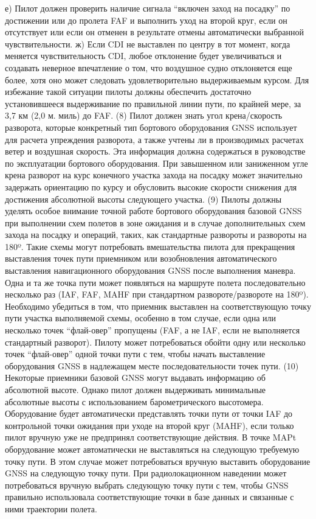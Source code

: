 е)	Пилот должен проверить наличие сигнала “включен заход на посадку” по достижении или до пролета FAF и выполнить уход на второй круг, если он отсутствует или если он отменен в результате отмены автоматически выбранной чувствительности.
ж)	Если CDI не выставлен по центру в тот момент, когда меняется чувствительность CDI, любое отклонение будет увеличиваться и создавать неверное впечатление о том, что воздушное судно отклоняется еще более, хотя оно может следовать удовлетворительно выдерживаемым курсом. Для избежание такой ситуации пилоты должны обеспечить достаточно установившееся выдерживание по правильной линии пути, по крайней мере, за 3,7 км (2,0 м. миль) до FAF.
(8) Пилот должен знать угол крена/скорость разворота, которые конкретный тип бортового оборудования GNSS использует для расчета упреждения разворота, а также учтены ли в производимых расчетах ветер и воздушная скорость. Эта информация должна содержаться в руководстве по эксплуатации бортового оборудования. При завышенном или заниженном угле крена разворот на курс конечного участка захода на посадку может значительно задержать ориентацию по курсу и обусловить высокие скорости снижения для достижения абсолютной высоты следующего участка.
(9) Пилоты должны уделять особое внимание точной работе бортового оборудования базовой GNSS при выполнении схем полетов в зоне ожидания и в случае дополнительных схем захода на посадку и операций, таких, как стандартные развороты и развороты на 180º. Такие схемы могут потребовать вмешательства пилота для прекращения выставления точек пути приемником или возобновления автоматического выставления навигационного оборудования GNSS после выполнения маневра. Одна и та же точка пути может появляться на маршруте полета последовательно несколько раз (IAF, FAF, MAHF при стандартном развороте/развороте на 180º). Необходимо убедиться в том, что приемник выставлен на соответствующую точку пути участка выполняемой схемы, особенно в том случае, если одна или несколько точек “флай-овер” пропущены (FAF, а не IAF, если не выполняется стандартный разворот). Пилоту может потребоваться обойти одну или несколько точек “флай-овер” одной точки пути с тем, чтобы начать выставление оборудования GNSS в надлежащем месте последовательности точек пути.
(10) Некоторые приемники базовой GNSS могут выдавать информацию об абсолютной высоте. Однако пилот должен выдерживать минимальные абсолютные высоты с использованием барометрического высотомера. Оборудование будет автоматически представлять точки пути от точки IAF до контрольной точки ожидания при уходе на второй круг (MAHF), если только пилот вручную уже не предпринял соответствующие действия. В точке MAPt оборудование может автоматически не выставляться на следующую требуемую точку пути. В этом случае может потребоваться вручную выставить оборудование GNSS на следующую точку пути. При радиолокационном наведении может потребоваться вручную выбрать следующую точку пути с тем, чтобы GNSS правильно использовала соответствующие точки в базе данных и связанные с ними траектории полета.

